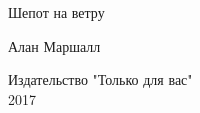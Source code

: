 \begin{center}
\begin{Huge}
Шепот на ветру\\
\end{Huge}
\vspace{1.5cm}
\begin{large}
Алан Маршалл\\
\end{large}
\vfill
Издательство "Только для вас"\\
    \vspace{1.5cm}
2017\\
\end{center}


